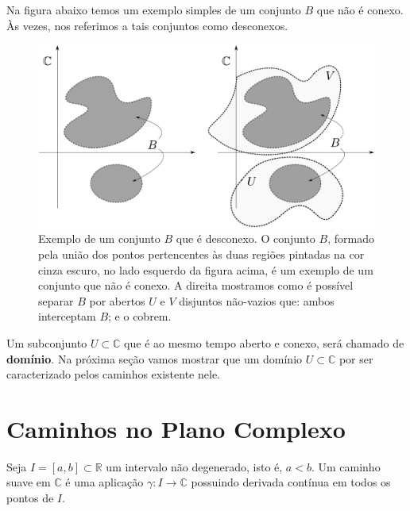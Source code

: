 Na figura abaixo temos um exemplo simples de um conjunto $B$ que não é conexo.
Às vezes, nos referimos a tais conjuntos como desconexos. 


\begin{figure}[h]
\centering
\includegraphics[width=0.9\linewidth]{"Figuras/fig-conjunto-desconexo"}
\caption[Conjunto Conexo]{Exemplo de um conjunto $B$ que é desconexo. 
O conjunto $B$, formado pela união dos pontos pertencentes às duas regiões pintadas na
cor cinza escuro, no lado esquerdo da figura acima, é um exemplo de um conjunto que não é conexo. 
A direita mostramos como é possível separar $B$ 
por abertos $U$ e $V$ disjuntos não-vazios que: ambos interceptam $B$; e o cobrem.}
\label{fig:conjunto-desconexo}
\end{figure}


Um subconjunto $U\subset\mathbb{C}$ que é ao mesmo tempo aberto e conexo, 
será chamado de 
{\bf domínio}. Na próxima seção vamos mostrar que 
um domínio $U\subset \mathbb{C}$ por ser caracterizado pelos
caminhos existente nele. 



\section{Caminhos no Plano Complexo}

\begin{definicao}\label{def-caminho-em-C}
Seja $I=[a,b]\subset\mathbb{R}$ um intervalo não degenerado, isto é, $a<b$. 
Um caminho suave 
em $\mathbb{C}$ é uma aplicação $\gamma:I\to \mathbb{C}$
possuindo derivada contínua em todos os pontos de $I$.
\end{definicao}

